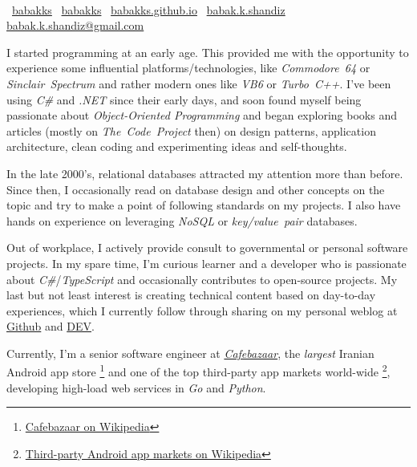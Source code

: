 \documentclass[10pt,a4paper]{article}
\begin{document}
\\
\noindent
\githubmark~\href{https://github.com/babakks}{babakks}
\headerentrybreak
\devbadge~\href{https://dev.to/babakks}{babakks}
\headerentrybreak
{}~\href{https://babakk.github.io}{babakks.github.io}
\hfill
\skypeicon~\href{skype:live:babak.k.shandiz}{babak.k.shandiz}
\headerentrybreak
{}~%
\href{mailto:babak.k.shandiz@gmail.com}{babak.k.shandiz@gmail.com}

\spacedhrule{0.9em}{-0.4em}

\vspace{-1.3em} %
\begin{multicols}{2}  %
    \noindent
    I started programming at an early age. This provided me with the opportunity
    to experience some influential platforms/technologies, like
    \textit{Commodore~64} or \textit{Sinclair~Spectrum} and rather modern ones
    like \textit{VB6} or \textit{Turbo~C++}. I've been using \textit{C\#} and
    \textit{.NET} since their early days, and soon found myself being passionate
    about \textit{Object-Oriented Programming} and began exploring books and
    articles (mostly on \textit{The~Code~Project} then) on design patterns,
    application architecture, clean coding and experimenting ideas and
    self-thoughts.

    In the late 2000's, relational databases attracted my attention more than
    before. Since then, I occasionally read on database design and other
    concepts on the topic and try to make a point of following standards on my
    projects. I also have hands on experience on leveraging \textit{NoSQL} or
    \textit{key/value~pair} databases.

    Out of workplace, I actively provide consult to governmental or personal
    software projects. In my spare time, I'm curious learner and a developer who
    is passionate about \textit{C\#}/\textit{TypeScript} and occasionally
    contributes to open-source projects. My last but not least interest is
    creating technical content based on day-to-day experiences, which I
    currently follow through sharing on my personal weblog at
    \href{https://babakks.github.io}{Github} and
    \href{https://dev.to/babakks}{DEV}.

    Currently, I'm a senior software engineer at
    \href{https://cafebazaar.ir}{\emph{Cafebazaar}}, the \textit{largest}
    Iranian Android app store%
    \footnote{\label{cb-on-wiki}%
        \href{https://en.wikipedia.org/wiki/Cafe\_Bazaar}{Cafebazaar on Wikipedia}}%
    and one of the top third-party app markets world-wide%
    \footnote{\label{3rd-party-stores-on-wiki}%
        \href{https://en.wikipedia.org/wiki/List\_of\_mobile\_app\_distribution\_platforms\#Third-party\_platforms}%
        {Third-party Android app markets on Wikipedia}},
    developing high-load web services in \textit{Go} and \textit{Python}.
\end{multicols}
\spacedhrule{0.5em}{-0.4em}
\end{document}
